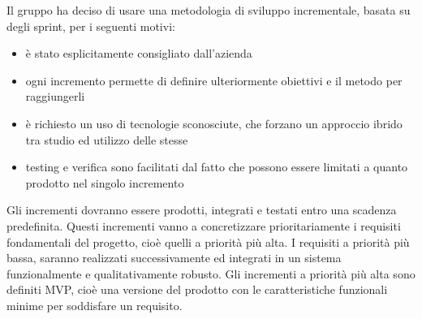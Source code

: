 Il gruppo ha deciso di usare una metodologia di sviluppo incrementale, basata su degli sprint, per i seguenti motivi:
\begin{itemize}
    \item 
        è stato esplicitamente consigliato dall'azienda
    \item 
        ogni incremento permette di definire ulteriormente 
        obiettivi e il metodo per raggiungerli
    \item 
        è richiesto un uso di tecnologie sconosciute, che forzano un 
        approccio ibrido tra studio ed utilizzo delle stesse
    \item
        testing e verifica sono facilitati dal fatto che possono essere 
        limitati a quanto prodotto nel singolo incremento
\end{itemize}
Gli incrementi dovranno essere prodotti, integrati e testati entro una scadenza predefinita. Questi incrementi vanno a concretizzare prioritariamente i requisiti fondamentali del progetto, cioè quelli a priorità più alta. I requisiti a priorità più bassa, saranno realizzati successivamente ed integrati in un sistema funzionalmente e qualitativamente robusto.
Gli incrementi a priorità più alta sono definiti MVP, cioè una versione del prodotto con le caratteristiche funzionali minime per soddisfare un requisito.




